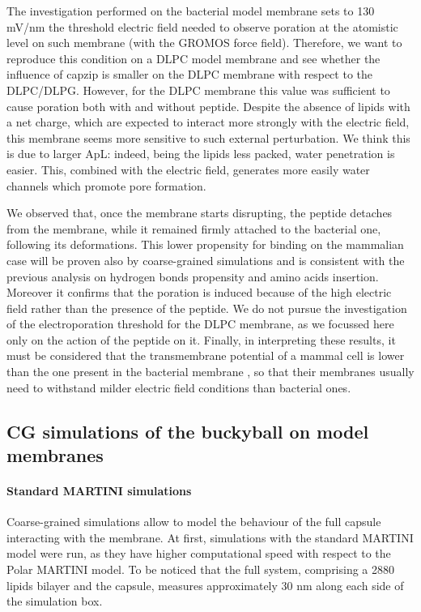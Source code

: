 The investigation performed on the bacterial model membrane sets to 130 mV/nm the threshold electric field needed to observe poration at the atomistic level on such membrane (with the GROMOS force field). Therefore, we want to reproduce this condition on a DLPC model membrane and see whether the influence of capzip is smaller on the DLPC membrane with respect to the DLPC/DLPG.
%
However, for the DLPC membrane this value was sufficient to cause poration both with and without peptide. Despite the absence of lipids with a net charge, which are expected to interact more strongly with the electric field, this membrane seems more sensitive to such external perturbation. We think this is due to larger ApL: indeed, being the lipids less packed, water penetration is easier. This, combined with the electric field, generates more easily water channels which promote pore formation.

We observed that, once the membrane starts disrupting, the peptide detaches from the membrane, while it remained firmly attached to the bacterial one, following its deformations. This lower propensity for binding on the mammalian case will be proven also by coarse-grained simulations and is consistent with the previous analysis on hydrogen bonds propensity and amino acids insertion. Moreover it confirms that the poration is induced because of the high electric field rather than the presence of the peptide. We do not pursue the investigation of the electroporation threshold for the DLPC membrane, as we focussed here only on the action of the peptide on it.
%
Finally, in interpreting these results, it must be considered that the transmembrane potential of a mammal cell is lower than the one present in the bacterial membrane \citep{Yeaman2003,Wilson2011}, so that their membranes usually need to withstand milder electric field conditions than bacterial ones.


\subsection{CG simulations of the buckyball on model membranes} \label{sec:results_lip_cg}

\paragraph{Standard MARTINI simulations} Coarse-grained simulations allow to model the behaviour of the full capsule interacting with the membrane.
%
At first, simulations with the standard MARTINI model were run, as they have higher computational speed with respect to the Polar MARTINI model. To be noticed that the full system, comprising a 2880 lipids bilayer and the capsule, measures approximately 30 nm along each side of the simulation box.


